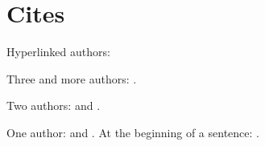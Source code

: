 \documentclass[english]{scrbook}
\begin{document}
\chapter{Cites}
Hyperlinked authors:

Three and more authors: \citeauthor{ABC01} \cite{ABC01}.

Two authors: \citeauthor{AB00} \cite{AB00} and \citeauthor{vdAW2013} \cite{vdAW2013}.

One author: \citeauthor{Ez10} \cite{Ez10} and \citeauthor{Go10} \cite{Go10}.
At the beginning of a sentence: .

\nocite{*}
\printbibliography
\end{document}
